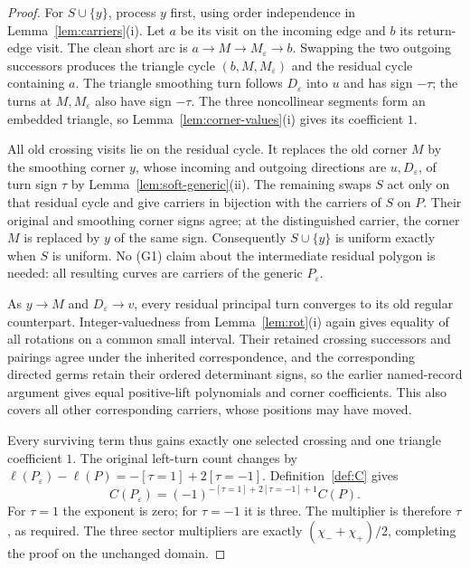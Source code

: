 \begin{proof}
For $S\cup\{y\}$, process $y$ first, using order independence
in Lemma~\ref{lem:carriers}(i). Let $a$ be its visit on the incoming
edge and $b$ its return-edge visit. The clean short arc is
$a\to M\to M_\varepsilon\to b$. Swapping the two outgoing
successors produces the triangle cycle $(b,M,M_\varepsilon)$
and the residual cycle containing $a$. The triangle smoothing
turn follows $D_\varepsilon$ into $u$ and has sign $-\tau$;
the turns at $M,M_\varepsilon$ also have sign $-\tau$.
The three noncollinear segments form an embedded triangle,
so Lemma~\ref{lem:corner-values}(i) gives its coefficient $1$.

All old crossing visits lie on the residual cycle. It replaces
the old corner $M$ by the smoothing corner $y$, whose incoming
and outgoing directions are $u,D_\varepsilon$, of turn sign
$\tau$ by Lemma~\ref{lem:soft-generic}(ii).
The remaining swaps $S$ act only on that residual cycle and give
carriers in bijection with the carriers of $S$ on $P$.
Their original and smoothing corner signs agree; at the distinguished
carrier, the corner $M$ is replaced by $y$ of the same sign.
Consequently $S\cup\{y\}$ is uniform exactly when $S$ is uniform.
No (G1) claim about the intermediate residual polygon is needed:
all resulting curves are carriers of the generic $P_\varepsilon$.

As $y\to M$ and $D_\varepsilon\to v$, every residual principal
turn converges to its old regular counterpart. Integer-valuedness
from Lemma~\ref{lem:rot}(i) again gives equality of all rotations
on a common small interval. Their retained crossing successors and pairings agree under the
inherited correspondence, and the corresponding directed germs
retain their ordered determinant signs,
so the earlier named-record argument gives equal positive-lift
polynomials and corner coefficients. This also covers all other
corresponding carriers, whose positions may have moved.

Every surviving term thus gains exactly one selected crossing and
one triangle coefficient $1$. The original left-turn count changes by
$\ell(P_\varepsilon)-\ell(P)=-[\tau=1]+2[\tau=-1]$.
Definition~\ref{def:C} gives
\[
C(P_\varepsilon)
=(-1)^{-[\tau=1]+2[\tau=-1]+1}C(P).
\]
For $\tau=1$ the exponent is zero; for $\tau=-1$ it is three.
The multiplier is therefore $\tau$, as required. The three sector
multipliers are exactly $(\chi_-+\chi_+)/2$, completing the proof
on the unchanged domain.
\end{proof}


